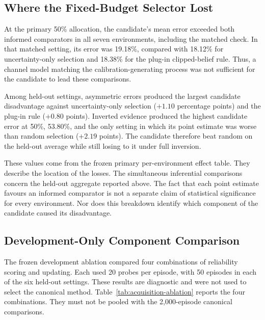 \subsection{Where the Fixed-Budget Selector Lost}

At the primary 50\% allocation, the candidate's mean error exceeded both informed comparators in all seven environments,
including the matched check. In that matched setting, its error was 19.18\%, compared with 18.12\% for uncertainty-only
selection and 18.38\% for the plug-in clipped-belief rule. Thus, a channel model matching the calibration-generating process
was not sufficient for the candidate to lead these comparisons.

Among held-out settings, asymmetric errors produced the largest candidate disadvantage against uncertainty-only selection
($+1.10$ percentage points) and the plug-in rule ($+0.80$ points). Inverted evidence produced the highest candidate error at
50\%, 53.80\%, and the only setting in which its point estimate was worse than random selection ($+2.19$ points).
The candidate therefore beat random on the held-out average while still losing to it under full inversion.

These values come from the frozen primary per-environment effect table. They describe the location of the losses. The
simultaneous inferential comparisons concern the held-out aggregate reported above. The fact that each point estimate favours
an informed comparator is not a separate claim of statistical significance for every environment. Nor does this breakdown
identify which component of the candidate caused its disadvantage.

\subsection{Development-Only Component Comparison}

The frozen development ablation compared four combinations of reliability scoring and updating. Each used 20 probes per episode,
with 50 episodes in each of the six held-out settings. These results are diagnostic and were not used to select the canonical
method. Table~\ref{tab:acquisition-ablation} reports the four combinations. They must not be pooled with the 2,000-episode
canonical comparisons.

